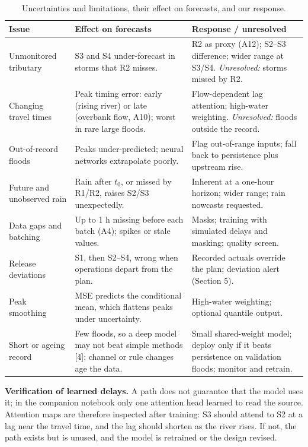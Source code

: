 \begin{table}[H]\centering\small
\caption{Uncertainties and limitations, their effect on forecasts, and our response.}
\label{tab:q1limits}
\begin{tabularx}{\linewidth}{@{}>{\raggedright\arraybackslash}p{2.9cm}LL@{}}
\toprule
Issue & Effect on forecasts & Response / unresolved\\
\midrule
Unmonitored tributary & S3 and S4 under-forecast in storms that R2 misses. & R2 as proxy (A12); S2--S3 difference; wider range at S3/S4. \emph{Unresolved:} storms missed by R2.\\
Changing travel times & Peak timing error: early (rising river) or late (overbank flow, A10); worst in rare large floods. & Flow-dependent lag attention; high-water weighting. \emph{Unresolved:} floods outside the record.\\
Out-of-record floods & Peaks under-predicted; neural networks extrapolate poorly. & Flag out-of-range inputs; fall back to persistence plus upstream rise.\\
Future and unobserved rain & Rain after $t_0$, or missed by R1/R2, raises S2/S3 unexpectedly. & Inherent at a one-hour horizon; wider range; rain nowcasts requested.\\
Data gaps and batching & Up to 1 h missing before each batch (A4); spikes or stale values. & Masks; training with simulated delays and masking; quality screen.\\
Release deviations & S1, then S2--S4, wrong when operations depart from the plan. & Recorded actuals override the plan; deviation alert (Section 5).\\
Peak smoothing & MSE predicts the conditional mean, which flattens peaks under uncertainty. & High-water weighting; optional quantile output.\\
Short or ageing record & Few floods, so a deep model may not beat simple methods [4]; channel or rule changes age the data. & Small shared-weight model; deploy only if it beats persistence on validation floods; monitor and retrain.\\
\bottomrule
\end{tabularx}
\end{table}

\textbf{Verification of learned delays.} A path does not guarantee that the model uses it; in the companion notebook only one attention head learned to read the source. Attention maps are therefore inspected after training: S3 should attend to S2 at a lag near the travel time, and the lag should shorten as the river rises. If not, the path exists but is unused, and the model is retrained or the design revised.

